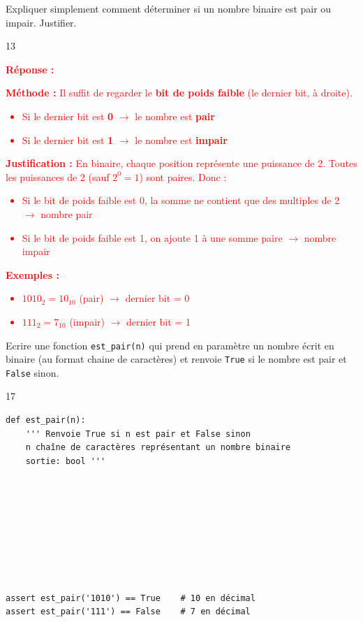 \documentclass[a4paper,10pt]{report}
\def\ptsexoG{2}
\def\ptsexoH{1}
\begin{document}
\pagebreak

\exods{\ptsexoG}

Expliquer simplement comment déterminer si un nombre binaire est pair ou impair. Justifier.

    \begin{answer}{1}{3}    \end{answer}

\textcolor{red}{
\textbf{Réponse :}

\textbf{Méthode :} Il suffit de regarder le \textbf{bit de poids faible} (le dernier bit, à droite).

\begin{itemize}
    \item Si le dernier bit est \textbf{0} $\rightarrow$ le nombre est \textbf{pair}
    \item Si le dernier bit est \textbf{1} $\rightarrow$ le nombre est \textbf{impair}
\end{itemize}

\textbf{Justification :} En binaire, chaque position représente une puissance de 2. Toutes les puissances de 2 (sauf $2^0 = 1$) sont paires. Donc :
\begin{itemize}
    \item Si le bit de poids faible est 0, la somme ne contient que des multiples de 2 $\rightarrow$ nombre pair
    \item Si le bit de poids faible est 1, on ajoute 1 à une somme paire $\rightarrow$ nombre impair
\end{itemize}

\textbf{Exemples :}
\begin{itemize}
    \item $1010_2 = 10_{10}$ (pair) $\rightarrow$ dernier bit = 0
    \item $111_2 = 7_{10}$ (impair) $\rightarrow$ dernier bit = 1
\end{itemize}
}



\medskip

\exods{\ptsexoH}

Ecrire une fonction \verb|est_pair(n)| qui prend en paramètre un nombre écrit en binaire (au format chaine de caractères) et renvoie \verb|True| si le nombre est pair et \verb|False| sinon.

    \begin{answer}{1}{7} 
\begin{verbatim}
def est_pair(n):
    ''' Renvoie True si n est pair et False sinon
    n chaîne de caractères représentant un nombre binaire
    sortie: bool '''









assert est_pair('1010') == True    # 10 en décimal
assert est_pair('111') == False    # 7 en décimal
    \end{verbatim}

    \end{answer}
\end{document}
